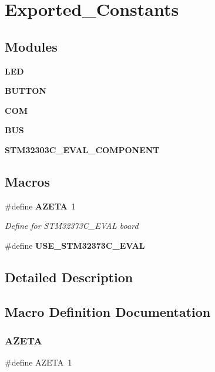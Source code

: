 \section{Exported\+\_\+\+Constants}
\label{group___exported___constants}
\subsection*{Modules}
\begin{DoxyCompactItemize}
\item 
\textbf{ L\+ED}
\item 
\textbf{ B\+U\+T\+T\+ON}
\item 
\textbf{ C\+OM}
\item 
\textbf{ B\+US}
\item 
\textbf{ S\+T\+M32303\+C\+\_\+\+E\+V\+A\+L\+\_\+\+C\+O\+M\+P\+O\+N\+E\+NT}
\end{DoxyCompactItemize}
\subsection*{Macros}
\begin{DoxyCompactItemize}
\item 
\#define \textbf{ A\+Z\+E\+TA}~1
\begin{DoxyCompactList}\small\item\em Define for S\+T\+M32373\+C\+\_\+\+E\+V\+AL board ~\newline
 \end{DoxyCompactList}\item 
\#define \textbf{ U\+S\+E\+\_\+\+S\+T\+M32373\+C\+\_\+\+E\+V\+AL}
\end{DoxyCompactItemize}


\subsection{Detailed Description}


\subsection{Macro Definition Documentation}
\mbox{\label{group___exported___constants_ga69c00bf7946b004e26bbf725ce64f43d}} 
\subsubsection{A\+Z\+E\+TA}
{\footnotesize\ttfamily \#define A\+Z\+E\+TA~1}



